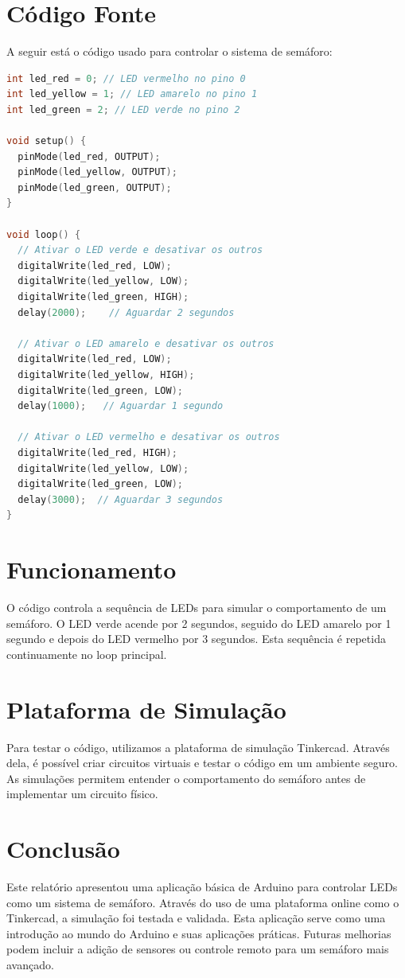\documentclass[a4paper,12pt]{article}
\begin{document}
\section{Código Fonte}
A seguir está o código usado para controlar o sistema de semáforo:

\begin{lstlisting}[language=C]
int led_red = 0; // LED vermelho no pino 0
int led_yellow = 1; // LED amarelo no pino 1
int led_green = 2; // LED verde no pino 2

void setup() {
  pinMode(led_red, OUTPUT);
  pinMode(led_yellow, OUTPUT);
  pinMode(led_green, OUTPUT);
}

void loop() {
  // Ativar o LED verde e desativar os outros
  digitalWrite(led_red, LOW); 
  digitalWrite(led_yellow, LOW);
  digitalWrite(led_green, HIGH);
  delay(2000);    // Aguardar 2 segundos
  
  // Ativar o LED amarelo e desativar os outros
  digitalWrite(led_red, LOW);   
  digitalWrite(led_yellow, HIGH);
  digitalWrite(led_green, LOW);
  delay(1000);   // Aguardar 1 segundo
  
  // Ativar o LED vermelho e desativar os outros
  digitalWrite(led_red, HIGH);  
  digitalWrite(led_yellow, LOW);
  digitalWrite(led_green, LOW);
  delay(3000);  // Aguardar 3 segundos        
}
\end{lstlisting}

\section{Funcionamento}
O código controla a sequência de LEDs para simular o comportamento de um semáforo. O LED verde acende por 2 segundos, seguido do LED amarelo por 1 segundo e depois do LED vermelho por 3 segundos. Esta sequência é repetida continuamente no loop principal.

\section{Plataforma de Simulação}
Para testar o código, utilizamos a plataforma de simulação Tinkercad. Através dela, é possível criar circuitos virtuais e testar o código em um ambiente seguro. As simulações permitem entender o comportamento do semáforo antes de implementar um circuito físico.

\section{Conclusão}
Este relatório apresentou uma aplicação básica de Arduino para controlar LEDs como um sistema de semáforo. Através do uso de uma plataforma online como o Tinkercad, a simulação foi testada e validada. Esta aplicação serve como uma introdução ao mundo do Arduino e suas aplicações práticas. Futuras melhorias podem incluir a adição de sensores ou controle remoto para um semáforo mais avançado.
\end{document}
